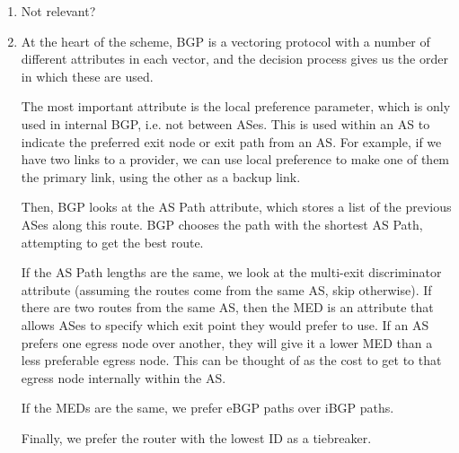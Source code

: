 


\begin{enumerate}[label=(\alph*)]
      \item

        Not relevant?

      \item
        At the heart of the scheme, BGP is a vectoring protocol with a number of different attributes in each vector, and the decision process gives us the order in which these are used.

        The most important attribute is the local preference parameter, which is only used in internal BGP, i.e. not between ASes. This is used within an AS to indicate the preferred exit node or exit path from an AS. For example, if we have two links to a provider, we can use local preference to make one of them the primary link, using the other as a backup link.

        Then, BGP looks at the AS Path attribute, which stores a list of the previous ASes along this route. BGP chooses the path with the shortest AS Path, attempting to get the best route.

        If the AS Path lengths are the same, we look at the multi-exit discriminator attribute (assuming the routes come from the same AS, skip otherwise). If there are two routes from the same AS, then the MED is an attribute that allows ASes to specify which exit point they would prefer to use. If an AS prefers one egress node over another, they will give it a lower MED than a less preferable egress node. This can be thought of as the cost to get to that egress node internally within the AS.

        If the MEDs are the same, we prefer eBGP paths over iBGP paths.

        Finally, we prefer the router with the lowest ID as a tiebreaker.
    \end{enumerate}

